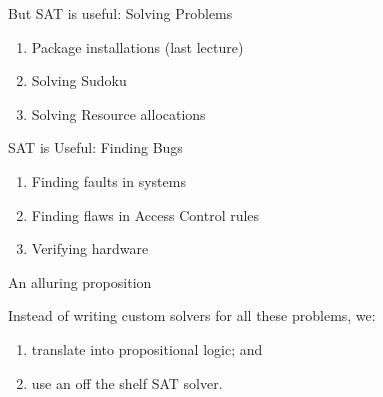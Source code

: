 \documentclass[xetex,aspectratio=169,14pt,hyperref={pdfpagelabels=true,pdflang={en-GB}}]{beamer}
\begin{document}
\begin{frame}
  {But SAT is useful: Solving Problems}

  \begin{enumerate}
  \item Package installations (last lecture) \\
  \item Solving Sudoku \\
  \item Solving Resource allocations \\
  \end{enumerate}

\end{frame}

\begin{frame}
  {SAT is Useful: Finding Bugs}

  \begin{enumerate}
  \item Finding faults in systems \\
  \item Finding flaws in Access Control rules \\
  \item Verifying hardware \\
  \end{enumerate}
\end{frame}


\begin{frame}
  {An alluring proposition}

  Instead of writing custom solvers for all these problems, we:
  \begin{enumerate}
  \item translate into propositional logic; and
  \item use an off the shelf SAT solver.
  \end{enumerate}
\end{frame}
\end{document}
